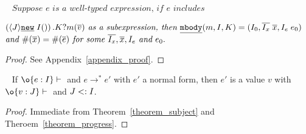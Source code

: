 \begin{theorem}[Progress]~\label{theorem_progress}
$\textit{Suppose } e \textit{ is a well-typed expression, if } e \textit{ includes} $

\noindent $\left(\langle J \rangle\emph{\texttt{new}}\;I()\right).K?m(\overline{v}) \textit{ as a subexpression, then } \emph{\texttt{mbody}}(m, I, K) = (I_0, \overline{I_x} \; \overline{x}, I_e\; e_0) $ $\textit{and } \#(\overline{x}) = \#(\overline{e}) \textit{ for some } \overline{I_x}, \overline{x}, I_e \textit{ and } e_0.$
\end{theorem}
\begin{proof}
See Appendix~\ref{appendix_proof}.
\end{proof}

\begin{theorem}~\label{theorem_soundness}
If $\judgeewf \o {e : I}$ and $e \to^* e'$ with $e'$ a normal form, then $e'$ is 
a value $v$ with $\judgeewf \o {v:J}$ and $J <: I$.
\end{theorem}
\begin{proof}
Immediate from Theorem~\ref{theorem_subject} and Theroem~\ref{theorem_progress}.
\end{proof}
